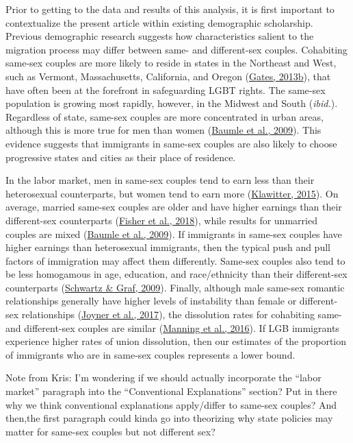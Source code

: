 \documentclass[
  11pt,
]{article}
\begin{document}
Prior to getting to the data and results of this analysis, it is first important to contextualize the present article within existing demographic scholarship. Previous demographic research suggests how characteristics salient to the migration process may differ between same- and different-sex couples. Cohabiting same-sex couples are more likely to reside in states in the Northeast and West, such as Vermont, Massachusetts, California, and Oregon (\protect\hyperlink{ref-gates_2013a}{Gates, 2013b}), that have often been at the forefront in safeguarding LGBT rights. The same-sex population is growing most rapidly, however, in the Midwest and South (\emph{ibid.}). Regardless of state, same-sex couples are more concentrated in urban areas, although this is more true for men than women (\protect\hyperlink{ref-baumle_2009}{Baumle et al., 2009}). This evidence suggests that immigrants in same-sex couples are also likely to choose progressive states and cities as their place of residence.

In the labor market, men in same-sex couples tend to earn less than their heterosexual counterparts, but women tend to earn more (\protect\hyperlink{ref-klawitter_2015}{Klawitter, 2015}). On average, married same-sex couples are older and have higher earnings than their different-sex counterparts (\protect\hyperlink{ref-fisher_2018}{Fisher et al., 2018}), while results for unmarried couples are mixed (\protect\hyperlink{ref-baumle_2009}{Baumle et al., 2009}). If immigrants in same-sex couples have higher earnings than heterosexual immigrants, then the typical push and pull factors of immigration may affect them differently. Same-sex couples also tend to be less homogamous in age, education, and race/ethnicity than their different-sex counterparts (\protect\hyperlink{ref-schwartz_2009}{Schwartz \& Graf, 2009}). Finally, although male same-sex romantic relationships generally have higher levels of instability than female or different-sex relationships (\protect\hyperlink{ref-joyner_2017}{Joyner et al., 2017}), the dissolution rates for cohabiting same- and different-sex couples are similar (\protect\hyperlink{ref-manning_2016}{Manning et al., 2016}). If LGB immigrants experience higher rates of union dissolution, then our estimates of the proportion of immigrants who are in same-sex couples represents a lower bound.

Note from Kris: I'm wondering if we should actually incorporate the ``labor market'' paragraph into the ``Conventional Explanations'' section? Put in there why we think conventional explanations apply/differ to same-sex couples? And then,the first paragraph could kinda go into theorizing why state policies may matter for same-sex couples but not different sex?
\end{document}
